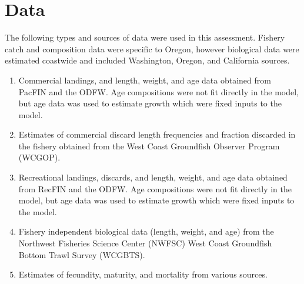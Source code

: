 \documentclass[11pt,
  english,
  a4paper,
]{article}
\begin{document}
\leavevmode\tagmcend\tagstructend\par


\hypertarget{data}{%
\section{Data}\label{data}}

\leavevmode\tagmcend\tagstructend


The following types and sources of data were used in this assessment. Fishery catch and composition data were specific to Oregon, however biological data were estimated coastwide and included Washington, Oregon, and California sources.

\leavevmode\tagmcend\tagstructend\par


\begin{enumerate}
\def\labelenumi{\arabic{enumi}.}
\item

  Commercial landings, and length, weight, and age data obtained from PacFIN and the ODFW. Age compositions were not fit directly in the model, but age data was used to estimate growth which were fixed inputs to the model.

  \tagmcend\tagstructend\tagstructend
\item

  Estimates of commercial discard length frequencies and fraction discarded in the fishery obtained from the West Coast Groundfish Observer Program (WCGOP).

  \tagmcend\tagstructend\tagstructend
\item

  Recreational landings, discards, and length, weight, and age data obtained from RecFIN and the ODFW. Age compositions were not fit directly in the model, but age data was used to estimate growth which were fixed inputs to the model.

  \tagmcend\tagstructend\tagstructend
\item

  Fishery independent biological data (length, weight, and age) from the Northwest Fisheries Science Center (NWFSC) West Coast Groundfish Bottom Trawl Survey (WCGBTS).

  \tagmcend\tagstructend\tagstructend
\item

  Estimates of fecundity, maturity, and mortality from various sources.

  \tagmcend\tagstructend\tagstructend
\end{enumerate}
\end{document}
